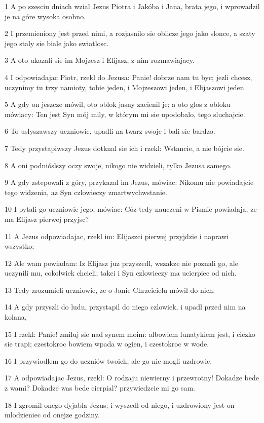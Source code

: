 \par 1 A po szesciu dniach wzial Jezus Piotra i Jakóba i Jana, brata jego, i wprowadzil je na góre wysoka osobno.
\par 2 I przemieniony jest przed nimi, a rozjasnilo sie oblicze jego jako slonce, a szaty jego staly sie biale jako swiatlosc.
\par 3 A oto ukazali sie im Mojzesz i Elijasz, z nim rozmawiajacy.
\par 4 I odpowiadajac Piotr, rzekl do Jezusa: Panie! dobrze nam tu byc; jezli chcesz, uczynimy tu trzy namioty, tobie jeden, i Mojzeszowi jeden, i Elijaszowi jeden.
\par 5 A gdy on jeszcze mówil, oto oblok jasny zacienil je; a oto glos z obloku mówiacy: Ten jest Syn mój mily, w którym mi sie upodobalo, tego sluchajcie.
\par 6 To uslyszawszy uczniowie, upadli na twarz swoje i bali sie bardzo.
\par 7 Tedy przystapiwszy Jezus dotknal sie ich i rzekl: Wstancie, a nie bójcie sie.
\par 8 A oni podnióslszy oczy swoje, nikogo nie widzieli, tylko Jezusa samego.
\par 9 A gdy zstepowali z góry, przykazal im Jezus, mówiac: Nikomu nie powiadajcie tego widzenia, az Syn czlowieczy zmartwychwstanie.
\par 10 I pytali go uczniowie jego, mówiac: Cóz tedy nauczeni w Pismie powiadaja, ze ma Elijasz pierwej przyjsc?
\par 11 A Jezus odpowiadajac, rzekl im: Elijaszci pierwej przyjdzie i naprawi wszystko;
\par 12 Ale wam powiadam: Iz Elijasz juz przyszedl, wszakze nie poznali go, ale uczynili mu, cokolwiek chcieli; takci i Syn czlowieczy ma ucierpiec od nich.
\par 13 Tedy zrozumieli uczniowie, ze o Janie Chrzcicielu mówil do nich.
\par 14 A gdy przyszli do ludu, przystapil do niego czlowiek, i upadl przed nim na kolana,
\par 15 I rzekl: Panie! zmiluj sie nad synem moim: albowiem lunatykiem jest, i ciezko sie trapi; czestokroc bowiem wpada w ogien, i czestokroc w wode.
\par 16 I przywiodlem go do uczniów twoich, ale go nie mogli uzdrowic.
\par 17 A odpowiadajac Jezus, rzekl: O rodzaju niewierny i przewrotny! Dokadze bede z wami? Dokadze was bede cierpial? przywiedzcie mi go sam.
\par 18 I zgromil onego dyjabla Jezus; i wyszedl od niego, i uzdrowiony jest on mlodzieniec od onejze godziny.
